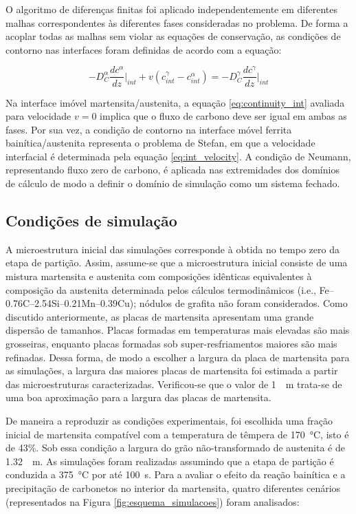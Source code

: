 O algoritmo de diferenças finitas foi aplicado independentemente em diferentes malhas correspondentes às diferentes fases consideradas no problema. De forma a acoplar todas as malhas sem violar as equações de conservação, as condições de contorno nas interfaces foram definidas de acordo com a equação:

\begin{equation}
  -D_C^\alpha \frac{d c^\alpha}{d z}\Bigg|_{int} + v\left(c^\gamma_{int} - c^\alpha_{int} \right) = -D_C^\gamma \frac{d c^\gamma}{d z}\Bigg|_{int} \label{eq:continuity_int}
\end{equation}

Na interface imóvel martensita/austenita, a equação \ref{eq:continuity_int} avaliada para velocidade $v = 0$ implica que o fluxo de carbono deve ser igual em ambas as fases. Por sua vez, a condição de contorno na interface móvel ferrita bainítica/austenita representa o problema de Stefan, %
em que a velocidade interfacial é determinada pela equação \ref{eq:int_velocity}. A condição de Neumann, representando fluxo zero de carbono, é aplicada nas extremidades dos domínios de cálculo de modo a definir o domínio de simulação como um sistema fechado.

\subsection{Condições de simulação}

A microestrutura inicial das simulações corresponde à obtida no tempo zero da etapa de partição. Assim, assume-se que a microestrutura inicial consiste de uma mistura martensita e austenita com composições idênticas equivalentes à composição da austenita determinada pelos cálculos termodinâmicos (i.e., Fe--0.76C--2.54Si--0.21Mn--0.39Cu); nódulos de grafita não foram considerados. Como discutido anteriormente, as placas de martensita apresentam uma grande dispersão de tamanhos. Placas formadas em temperaturas mais elevadas são mais grosseiras, enquanto placas formadas sob super-resfriamentos maiores são mais refinadas. Dessa forma, de modo a escolher a largura da placa de martensita para as simulações, a largura das maiores placas de martensita foi estimada a partir das microestruturas caracterizadas. Verificou-se que o valor de \SI{1}{\mu m} trata-se de uma boa aproximação para a largura das placas de martensita.

De maneira a reproduzir as condições experimentais, foi escolhida uma fração inicial de martensita compatível com a temperatura de têmpera de \SI{170}{\degreeCelsius}, isto é de 43\%. Sob essa condição a largura do grão não-transformado de austenita é de \SI{1,32}{\mu m}. As simulações foram realizadas assumindo que a etapa de partição é conduzida a \SI{375}{\degreeCelsius} por até 100~s. Para a avaliar o efeito da reação bainítica e a precipitação de carbonetos no interior da martensita, quatro diferentes cenários (representados na Figura \ref{fig:esquema_simulacoes}) foram analisados:

